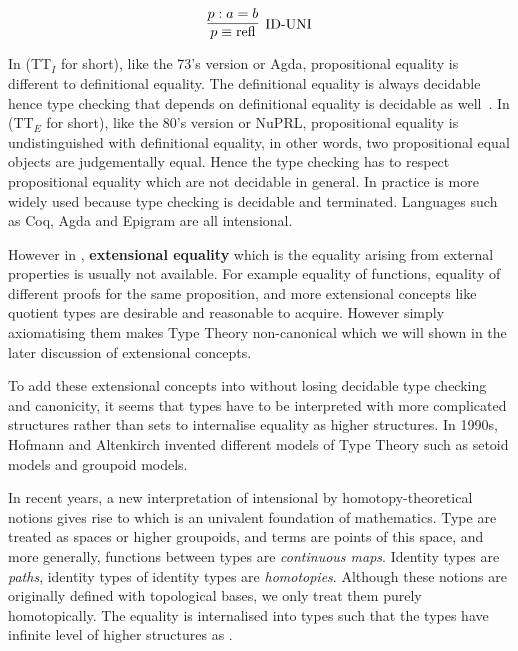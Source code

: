 \begin{equation}
\label{ID-Uni}
\infer[\text{ID-UNI}]{p \equiv \text{refl}}{p : a = b}
\end{equation}

In \itt (TT$_I$ for short), like the 73's version or Agda, propositional equality is different to definitional equality. 
The definitional equality is always decidable hence type checking that depends on definitional equality is
decidable as well~\cite{alti:lics99}.
In \ett (TT$_E$ for short), like the 80's version \cite{martin1984intuitionistic} or NuPRL, propositional equality is undistinguished with definitional equality, in other words, two propositional equal objects are judgementally equal. Hence the type checking has to respect propositional equality which are not decidable in general.
In practice \itt is more widely used because type checking is decidable and terminated. Languages such as Coq, Agda and Epigram are all intensional.

However in \itt, \textbf{extensional equality} which is the equality arising from external properties is usually not available. For example equality of functions, equality of different proofs for the same proposition, and more extensional concepts like quotient types are desirable and reasonable to acquire. However simply axiomatising them makes Type Theory non-canonical which we will shown in the later discussion of extensional concepts.


To add these extensional concepts into \itt without losing decidable type checking and canonicity, it seems that types have to be interpreted with more complicated structures rather than sets to internalise equality as higher structures.
In 1990s, Hofmann and Altenkirch invented different models of Type Theory such as setoid models and groupoid models.




In recent years, a new interpretation of intensional \mltt by homotopy-theoretical notions \cite{voe:06} gives rise to \hott which is an univalent foundation of mathematics. 
Type are treated as spaces or higher groupoids, and terms are points of this space, and more generally, functions between types are \emph{continuous maps}. Identity types are \emph{paths}, identity types of identity types are \emph{homotopies}. Although these notions are originally defined with topological bases, we only treat them purely homotopically. The equality is internalised into types such that the types have infinite level of higher structures as \wog.


